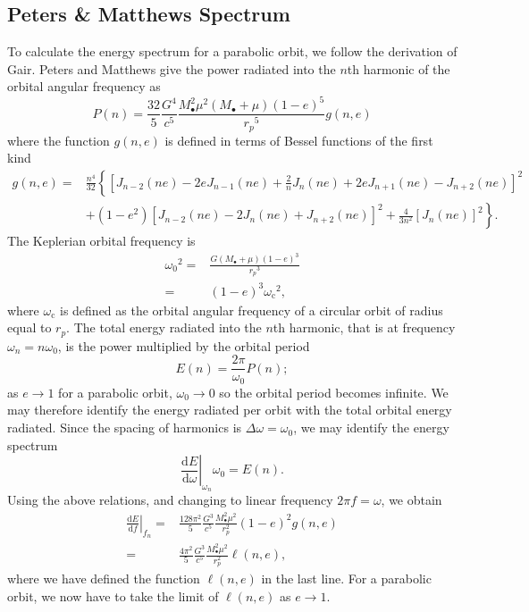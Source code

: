 \documentclass[a4paper, 11pt, titlepage, twoside]{report}
\newcommand{\sub}[1]{\ensuremath{_\mathrm{#1}}}
\newcommand{\dd}{\ensuremath{\mathrm{d}}}
\newcommand{\diff}[2]{\ensuremath{\frac{\dd {#1}}{\dd {#2}}}}
\begin{document}
{\subsection{Peters \& Matthews Spectrum}

To calculate the energy spectrum for a parabolic orbit, we follow the derivation of Gair\cite{Gair2010}. Peters and Matthews give the power radiated into the $n$th harmonic of the orbital angular frequency as
\begin{equation}
P(n) = \frac{32}{5}\frac{G^4}{c^5}\frac{M_\bullet^2\mu^2(M_\bullet + \mu)(1-e)^5}{{r_p}^5}g(n,e)
\label{eq:PM_P}
\end{equation}
where the function $g(n,e)$ is defined in terms of Bessel functions of the first kind
\begin{align}
g(n,e) = {} & \frac{n^4}{32}\left\{\left[J_{n-2}(ne) - 2eJ_{n-1}(ne) + \frac{2}{n}J_n(ne) + 2eJ_{n+1}(ne) - J_{n+2}(ne)\right]^2 \right. \nonumber \\
 & + \left. \left(1 - e^2\right)\left[J_{n-2}(ne) - 2J_n(ne) + J_{n+2}(ne)\right]^2 + \frac{4}{3n^2}\left[J_n(ne)\right]^2\right\}.
\end{align}
The Keplerian orbital frequency is
\begin{align}
{\omega_0}^2 = {} & \frac{G(M_\bullet + \mu)(1-e)^3}{{r_p}^3}\\
 = {} & (1-e)^3{\omega\sub{c}}^2,
\label{eq:Kepler_freq}
\end{align}
where $\omega\sub{c}$ is defined as the orbital angular frequency of a circular orbit of radius equal to $r_p$. The total energy radiated into the $n$th harmonic, that is at frequency $\omega_n = n\omega_0$, is the power multiplied by the orbital period
\begin{equation}
E(n) = \frac{2\pi}{\omega_0}P(n);
\label{eq:E(n)}
\end{equation}
as $e \rightarrow 1$ for a parabolic orbit, $\omega_0 \rightarrow 0$ so the orbital period becomes infinite. We may therefore identify the energy radiated per orbit with the total orbital energy radiated. Since the spacing of harmonics is $\Delta\omega = \omega_0$, we may identify the energy spectrum
\begin{equation}
\left.\diff{E}{\omega}\right|_{\omega_n}\omega_0 = E(n).
\end{equation}
Using the above relations, and changing to linear frequency $2\pi f = \omega$, we obtain
\begin{align}
\left.\diff{E}{f}\right|_{f_n} = {} & \frac{128\pi^2}{5}\frac{G^3}{c^5}\frac{M_\bullet^2\mu^2}{r_p^2}(1-e)^2g(n,e) \\
 = {} & \frac{4\pi^2}{5}\frac{G^3}{c^5}\frac{M_\bullet^2\mu^2}{r_p^2}\ell(n,e),
\label{eq:PM_spectrum}
\end{align}
where we have defined the function $\ell(n,e)$ in the last line. For a parabolic orbit, we now have to take the limit of $\ell(n,e)$ as $e \rightarrow 1$.

}
\end{document}
